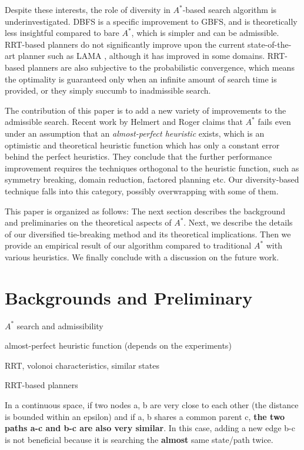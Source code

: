 Despite these interests, the role of diversity in \(A^*\)-based search
algorithm is underinvestigated.
DBFS is a specific improvement to GBFS, and is theoretically less insightful compared
to bare \(A^*\), which is simpler and can be admissible.
RRT-based planners do not significantly improve upon the current
state-of-the-art planner such as LAMA \cite{alcazar2011adapting}, although it
has improved in some domains. RRT-based planners are also subjective to
the probabilistic convergence, which means the optimality is guaranteed
only when an infinite amount of search time is provided, or they simply succumb to
inadmissible search.


The contribution of this paper is to add a new variety of improvements to the admissible search.
Recent work by Helmert and Roger \cite{helmert2008good} claims that \(A^*\) fails even under an
assumption that an \emph{almost-perfect heuristic} exists, which is an
optimistic and theoretical heuristic function which has only a constant error
behind the perfect heuristics.
They conclude that the further performance improvement requires the
techniques orthogonal to the heuristic function, such as symmetry breaking,
domain reduction, factored planning etc.
Our diversity-based technique falls into this category, possibly
overwrapping with some of them.

This paper is organized as follows: The next section describes the background and preliminaries on the theoretical aspects of \(A^*\). Next, we describe the details of our diversified tie-breaking method and its theoretical implications.  Then we provide an empirical result of our algorithm compared to traditional \(A^*\) with various heuristics. We finally conclude with a discussion on the future work.

\section{Backgrounds and Preliminary}
\label{sec-1}

\(A^*\) search and admissibility

almost-perfect heuristic function (depends on the experiments)

RRT, volonoi characteristics, similar states

RRT-based planners

In a continuous space,
if two nodes a, b are very close to each other (the distance is bounded within an epsilon)
and if a, b shares a common parent c,
\textbf{the two paths a-c and b-c are also very similar}.
In this case, adding a new edge b-c is
not beneficial because it is searching the \textbf{almost} same state/path twice.

